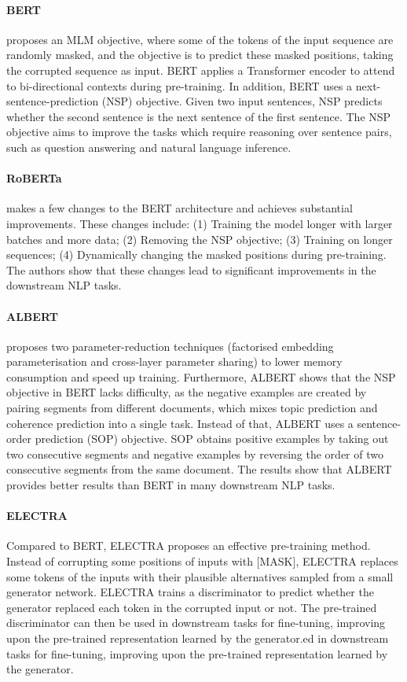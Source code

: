 \paragraph{BERT} \autocite{devlin-etal-2019-bert} proposes an MLM objective, where some of the tokens of the input sequence are randomly masked, and the objective is to predict these masked positions, taking the corrupted sequence as input. BERT applies a Transformer encoder to attend to bi-directional contexts during pre-training. In addition, BERT uses a next-sentence-prediction (NSP) objective. Given two input sentences, NSP predicts whether the second sentence is the next sentence of the first sentence. The NSP objective aims to improve the tasks which require reasoning over sentence pairs, such as question answering and natural language inference. 

\paragraph{RoBERTa} \autocite{liu2019roberta} makes a few changes to the BERT architecture and achieves substantial improvements. These changes include: (1) Training the model longer with larger batches and more data; (2) Removing the NSP objective; (3) Training on longer sequences; (4) Dynamically changing the masked positions during pre-training. The authors show that these changes lead to significant improvements in the downstream NLP tasks.

\paragraph{ALBERT} \autocite{Lan2020ALBERT} proposes two parameter-reduction techniques (factorised embedding parameterisation and cross-layer parameter sharing) to lower memory consumption and speed up training. Furthermore, ALBERT \autocite{Lan2020ALBERT} shows that the NSP objective in BERT lacks difficulty, as the negative examples are created by pairing segments from different documents, which mixes topic prediction and coherence prediction into a single task. Instead of that, ALBERT uses a sentence-order prediction (SOP) objective. SOP obtains positive examples by taking out two consecutive segments and negative examples by reversing the order of two consecutive segments from the same document. The results show that ALBERT provides better results than BERT in many downstream NLP tasks.


\paragraph{ELECTRA} Compared to BERT, ELECTRA \autocite{Clark2020ELECTRA} proposes an effective pre-training method. Instead of corrupting some positions of inputs with [MASK], ELECTRA replaces some tokens of the inputs with their plausible alternatives sampled from a small generator network. ELECTRA trains a discriminator to predict whether the generator replaced each token in the corrupted input or not. The pre-trained discriminator can then be used in downstream tasks for fine-tuning, improving upon the pre-trained representation learned by the generator.ed in downstream tasks for fine-tuning, improving upon the pre-trained representation learned by the generator.

